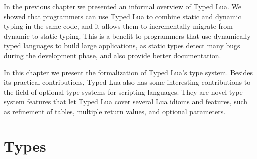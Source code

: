 
In the previous chapter we presented an informal overview of Typed Lua.
We showed that programmers can use Typed Lua to combine static and dynamic
typing in the same code, and it allows them to incrementally migrate from
dynamic to static typing.
This is a benefit to programmers that use dynamically typed languages
to build large applications, as static types detect many bugs
during the development phase, and also provide better documentation.

In this chapter we present the formalization of Typed Lua's type system.
Besides its practical contributions, Typed Lua also has some interesting
contributions to the field of optional type systems for scripting
languages.
They are novel type system features that let Typed Lua cover several Lua idioms
and features, such as refinement of tables, multiple return values,
and optional parameters.

\section{Types}
\label{sec:types}

